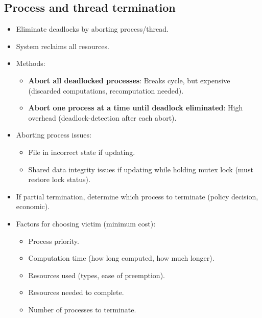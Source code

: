 \subsection{Process and thread termination}
\begin{itemize}
    \item Eliminate deadlocks by aborting process/thread.
    \item System reclaims all resources.
    \item Methods:
    \begin{itemize}
        \item \textbf{Abort all deadlocked processes}: Breaks cycle, but expensive (discarded computations, recomputation needed).
        \item \textbf{Abort one process at a time until deadlock eliminated}: High overhead (deadlock-detection after each abort).
    \end{itemize}
    \item Aborting process issues:
    \begin{itemize}
        \item File in incorrect state if updating.
        \item Shared data integrity issues if updating while holding mutex lock (must restore lock status).
    \end{itemize}
    \item If partial termination, determine which process to terminate (policy decision, economic).
    \item Factors for choosing victim (minimum cost):
    \begin{itemize}
        \item Process priority.
        \item Computation time (how long computed, how much longer).
        \item Resources used (types, ease of preemption).
        \item Resources needed to complete.
        \item Number of processes to terminate.
    \end{itemize}
\end{itemize}

